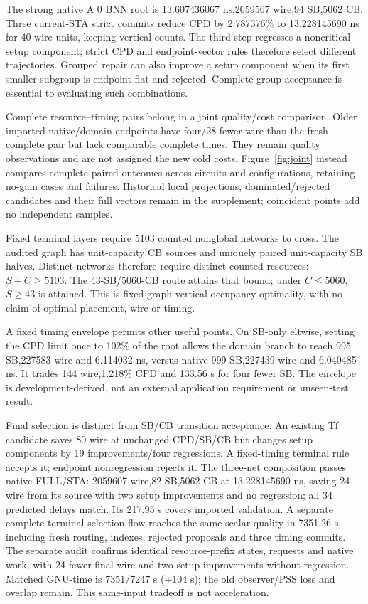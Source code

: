 \documentclass[conference,10pt]{IEEEtran}
\begin{document}
The strong native A 0 BNN root is 13.607436067 ns,2059567 wire,94 SB,5062 CB. Three current-STA strict commits reduce CPD by 2.787376\% to 13.228145690 ns for 40 wire units, keeping vertical counts. The third step regresses a noncritical setup component; strict CPD and endpoint-vector rules therefore select different trajectories. Grouped repair can also improve a setup component when its first smaller subgroup is endpoint-flat and rejected. Complete group acceptance is essential to evaluating such combinations.

Complete resource--timing pairs belong in a joint quality/cost comparison. Older imported native/domain endpoints have four/28 fewer wire than the fresh complete pair but lack comparable complete times. They remain quality observations and are not assigned the new cold costs. Figure~\ref{fig:joint} instead compares complete paired outcomes across circuits and configurations, retaining no-gain cases and failures. Historical local projections, dominated/rejected candidates and their full vectors remain in the supplement; coincident points add no independent samples.

Fixed terminal layers require 5103 counted nonglobal networks to cross. The audited graph has unit-capacity CB sources and uniquely paired unit-capacity SB halves. Distinct networks therefore require distinct counted resources: $S+C\ge 5103$. The 43-SB/5060-CB route attains that bound; under $C\le 5060$, $S\ge 43$ is attained. This is fixed-graph vertical occupancy optimality, with no claim of optimal placement, wire or timing.

A fixed timing envelope permits other useful points. On SB-only eltwise, setting the CPD limit once to 102\% of the root allows the domain branch to reach 995 SB,227583 wire and 6.114032 ns, versus native 999 SB,227439 wire and 6.040485 ns. It trades 144 wire,1.218\% CPD and 133.56 s for four fewer SB. The envelope is development-derived, not an external application requirement or unseen-test result.

Final selection is distinct from SB/CB transition acceptance. An existing Tf candidate saves 80 wire at unchanged CPD/SB/CB but changes setup components by 19 improvements/four regressions. A fixed-timing terminal rule accepts it; endpoint nonregression rejects it. The three-net composition passes native FULL/STA: 2059607 wire,82 SB,5062 CB at 13.228145690 ns, saving 24 wire from its source with two setup improvements and no regression; all 34 predicted delays match. Its 217.95 s covers imported validation. A separate complete terminal-selection flow reaches the same scalar quality in 7351.26 s, including fresh routing, indexes, rejected proposals and three timing commits. The separate audit confirms identical resource-prefix states, requests and native work, with 24 fewer final wire and two setup improvements without regression. Matched GNU-time is 7351/7247 s (+104 s); the old observer/PSS loss and overlap remain. This same-input tradeoff is not acceleration.
\end{document}
